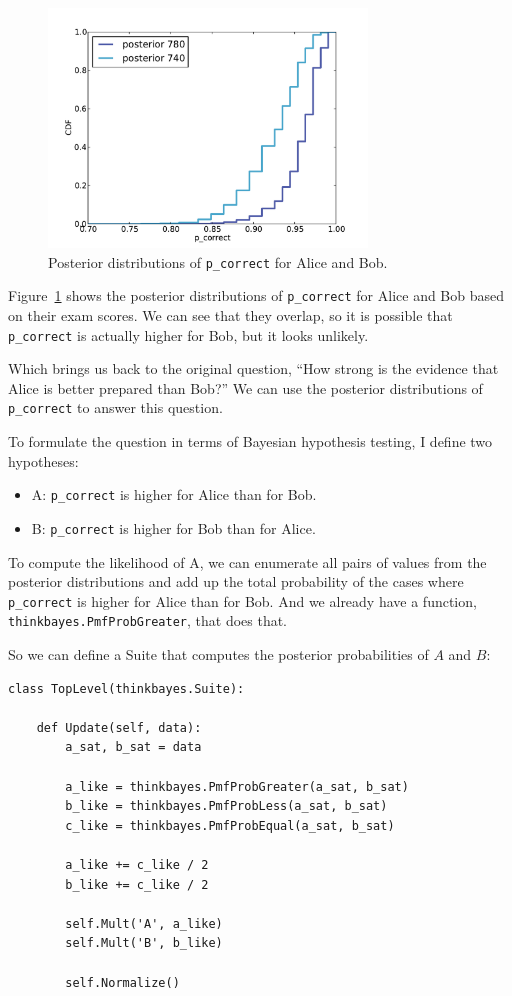 \documentclass[12pt]{book}
\begin{document}
\begin{figure}
\centerline{\includegraphics[height=2.5in]{figs/sat_posteriors_p_corr.pdf}}
\caption{Posterior distributions of {\tt p\_correct} for Alice and Bob.}
\label{fig.satposterior1}
\end{figure}

Figure~\ref{fig.satposterior1} shows the posterior distributions
of \verb"p_correct" for Alice and Bob based on their exam scores.
We can see that they overlap, so it is possible that \verb"p_correct"
is actually higher for Bob, but it looks unlikely.

Which brings us back to the original question, ``How strong is the
evidence that Alice is better prepared than Bob?''  We can use the
posterior distributions of \verb"p_correct" to answer this question.

To formulate the question in terms of Bayesian hypothesis testing,
I define two hypotheses:

\begin{itemize}

\item A: \verb"p_correct" is higher for Alice than for Bob.

\item B: \verb"p_correct" is higher for Bob than for Alice.

\end{itemize}

To compute the likelihood of A, we can enumerate all pairs of values
from the posterior distributions and add up the total probability of
the cases where \verb"p_correct" is higher for Alice than for Bob.
And we already have a function, \verb"thinkbayes.PmfProbGreater",
that does that.

So we can define a Suite that computes the posterior probabilities
of $A$ and $B$:

\begin{verbatim}
class TopLevel(thinkbayes.Suite):

    def Update(self, data):
        a_sat, b_sat = data

        a_like = thinkbayes.PmfProbGreater(a_sat, b_sat)
        b_like = thinkbayes.PmfProbLess(a_sat, b_sat)
        c_like = thinkbayes.PmfProbEqual(a_sat, b_sat)

        a_like += c_like / 2
        b_like += c_like / 2

        self.Mult('A', a_like)
        self.Mult('B', b_like)

        self.Normalize()
\end{verbatim}
\end{document}
